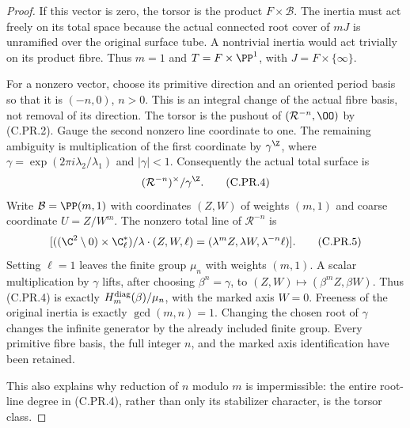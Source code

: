 \begin{proof}
If this vector is zero, the torsor is the product
$F\times\mathcal B$. The inertia must act freely on its total
space because the actual connected root cover of $mJ$ is
unramified over the original surface tube. A nontrivial inertia
would act trivially on its product fibre. Thus $m=1$ and
$T=F\times\PP^1$, with $J=F\times\{\infty\}$.

For a nonzero vector, choose its primitive direction and an
oriented period basis so that it is $(-n,0)$, $n>0$. This is
an integral change of the actual fibre basis, not removal of
its direction. The torsor is the pushout of
$(\mathcal R^{-n},\OO)$ by (C.PR.2). Gauge the second nonzero
line coordinate to one. The remaining ambiguity is multiplication
of the first coordinate by
$\gamma^{\Z}$, where
$\gamma=\exp(2\pi i\lambda_2/\lambda_1)$ and $|\gamma|<1$.
Consequently the actual total surface is
\[
                         (\mathcal R^{-n})^\times/\gamma^{\Z}.
                                                        \tag{C.PR.4}
\]
Write $\mathcal B=\PP(m,1)$ with coordinates $(Z,W)$ of
weights $(m,1)$ and coarse coordinate $U=Z/W^m$.
The nonzero total line of $\mathcal R^{-n}$ is
\[
 [((\C^2\setminus0)\times\C^*_\ell)/
              \lambda\cdot(Z,W,\ell)
                =(\lambda^mZ,\lambda W,\lambda^{-n}\ell)].
                                                        \tag{C.PR.5}
\]
Setting $\ell=1$ leaves the finite group $\mu_n$ with weights
$(m,1)$. A scalar multiplication by $\gamma$ lifts, after choosing
$\beta^n=\gamma$, to $(Z,W)\mapsto(\beta^mZ,\beta W)$.
Thus (C.PR.4) is exactly
$H_m^{\rm diag}(\beta)/\mu_n$, with the marked axis $W=0$.
Freeness of the original inertia is exactly
$\gcd(m,n)=1$. Changing the chosen root of $\gamma$ changes
the infinite generator by the already included finite group.
Every primitive fibre basis, the full integer $n$, and the marked
axis identification have been retained.

This also explains why reduction of $n$ modulo $m$ is impermissible:
the entire root-line degree in (C.PR.4), rather than only its
stabilizer character, is the torsor class.


\end{proof}
